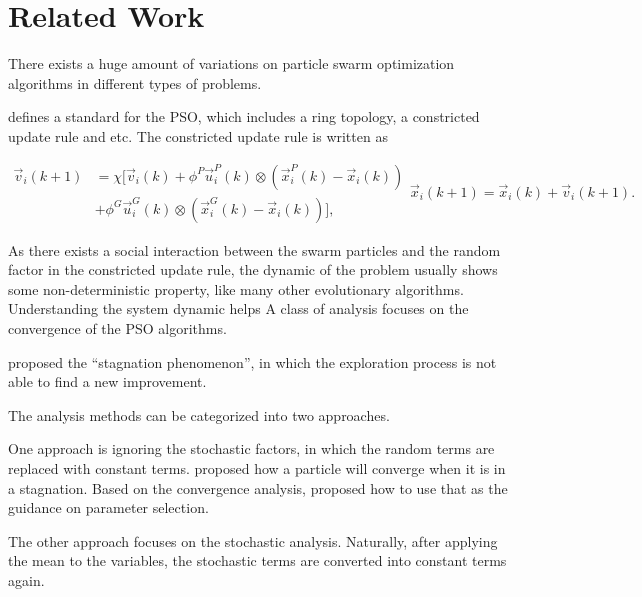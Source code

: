 \section{Related Work}

There exists a huge amount of variations on particle swarm optimization algorithms in different types of problems. 

\cite{4223164} defines a standard for the PSO, which includes a ring topology, a constricted update rule and etc. 
The constricted update rule is written as

\begin{subequations}
\label{eq:pso_alg}
\begin{equation}
\label{eq:up_vel}
\begin{aligned}
\vec{v}_{i}(k+1) & = \chi [ \vec{v}_{i}(k) 
 + \phi^{P} \vec{u}^{P}_{i}(k) \otimes (\vec{x}^{P}_{i}(k) - \vec{x}_{i}(k)) \\
& + \phi^{G} \vec{u}^{G}_{i}(k) \otimes (\vec{x}^{G}_{i}(k) - \vec{x}_{i}(k)) ],
\end{aligned}
\end{equation}
\begin{equation}
\label{eq:up_pos}
\vec{x}_{i}(k+1) = \vec{x}_{i}(k) + \vec{v}_{i}(k+1).
\end{equation}
\end{subequations}

As there exists a social interaction between the swarm particles and the random factor in the constricted update rule, the dynamic of the problem usually shows some non-deterministic property, like many other evolutionary algorithms.
Understanding the system dynamic helps 
A class of analysis focuses on the convergence of the PSO algorithms. 

\cite{Clerc06stagnationanalysis} proposed the ``stagnation phenomenon'', in which the exploration process is not able to find a new improvement.

The analysis methods can be categorized into two approaches.

One approach is ignoring the stochastic factors, in which the random terms are replaced with constant terms.
\cite{985692} proposed how a particle will converge when it is in a stagnation.
Based on the convergence analysis, \cite{Trelea2003317} proposed how to use that as the guidance on parameter selection.


The other approach focuses on the stochastic analysis.
Naturally, after applying the mean to the variables, the stochastic terms are converted into constant terms again. 


